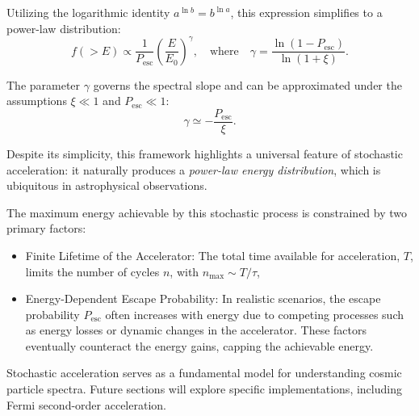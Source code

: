 Utilizing the logarithmic identity \( a^{\ln b} = b^{\ln a} \), this expression simplifies to a power-law distribution:
\[
f(>E) \propto \frac{1}{P_{\text{esc}}} \left( \frac{E}{E_0} \right)^{\gamma}, \quad \text{where} \quad \gamma = \frac{\ln (1-P_{\text{esc}})}{\ln (1+\xi)}.
\]

The parameter \( \gamma \) governs the spectral slope and can be approximated under the assumptions \( \xi \ll 1 \) and \( P_{\text{esc}} \ll 1 \):
\[
\gamma \simeq -\frac{P_{\text{esc}}}{\xi}.
\]

Despite its simplicity, this framework highlights a universal feature of stochastic acceleration: it naturally produces a \emph{power-law energy distribution}, which is ubiquitous in astrophysical observations.  

The maximum energy achievable by this stochastic process is constrained by two primary factors:
\begin{itemize}
\item Finite Lifetime of the Accelerator: The total time available for acceleration, \( T \), limits the number of cycles \( n \), with \( n_{\text{max}} \sim T / \tau \),
\item Energy-Dependent Escape Probability: In realistic scenarios, the escape probability \( P_{\text{esc}} \) often increases with energy due to competing processes such as energy losses or dynamic changes in the accelerator. These factors eventually counteract the energy gains, capping the achievable energy.
\end{itemize}

Stochastic acceleration serves as a fundamental model for understanding cosmic particle spectra. Future sections will explore specific implementations, including Fermi second-order acceleration.